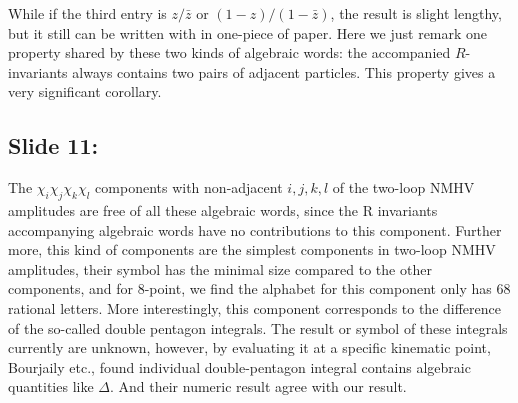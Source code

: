 \documentclass[a4paper,11pt]{article}
\begin{document}
While if the third entry is $z/{\bar{z}}$ or $(1-z)/(1-\bar{z})$, the result is slight lengthy, but it still can be written with in one-piece of paper. Here we just remark one property shared by these two kinds of algebraic words: the accompanied $R$-invariants always contains two pairs of adjacent particles. This property gives a  very significant corollary.

\subsection{Slide 11:}

The $\chi_{i}\chi_{j}\chi_{k}\chi_{l}$ components with non-adjacent $i,j,k,l$ of the two-loop NMHV amplitudes are free of all these algebraic words, since the R invariants accompanying algebraic words have no contributions to this component. Further more, this kind of components are the simplest components in two-loop NMHV amplitudes, their symbol has the minimal size compared to the other components, and for 8-point, we find the alphabet for this component only has 68 rational letters. More interestingly, this component corresponds to the difference of the so-called double pentagon integrals. The result or symbol of these integrals currently are unknown, however, by evaluating it at a specific kinematic point, Bourjaily etc., found individual double-pentagon integral contains algebraic quantities like $\Delta$. And their numeric result agree with our result.








\end{document}
